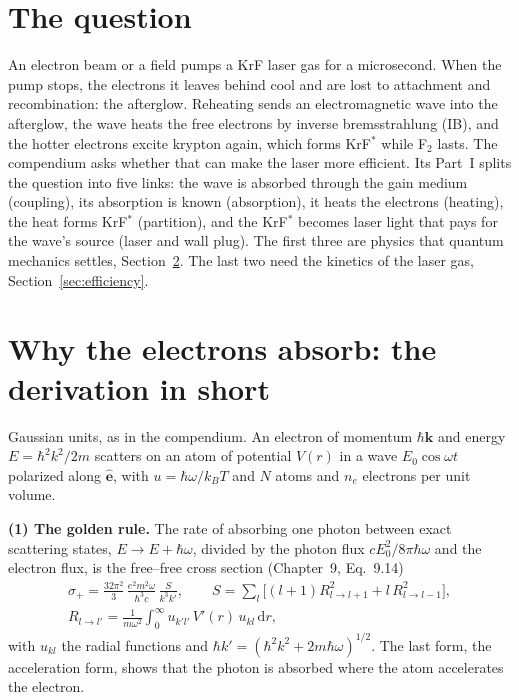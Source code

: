 \documentclass[11pt]{article}
\newcommand{\Ft}{F\ensuremath{_2}}
\newcommand{\KrF}{KrF\ensuremath{^*}}
\newcommand{\dd}{\mathrm d}
\newcommand{\kB}{k_B}
\begin{document}
\section{The question}
An electron beam or a field pumps a KrF laser gas for a microsecond. When the pump stops, the
electrons it leaves behind cool and are lost to attachment and recombination: the afterglow.
Reheating sends an electromagnetic wave into the afterglow, the wave heats the free electrons
by inverse bremsstrahlung (IB), and the hotter electrons excite krypton again, which forms
\KrF{} while \Ft{} lasts. The compendium asks whether that can make the laser more efficient.
Its Part~I splits the question into five links: the wave is absorbed through the gain medium
(coupling), its absorption is known (absorption), it heats the electrons (heating), the heat
forms \KrF{} (partition), and the \KrF{} becomes laser light that pays for the wave's source
(laser and wall plug). The first three are physics that quantum mechanics settles,
Section~\ref{sec:derivation}. The last two need the kinetics of the laser gas,
Section~\ref{sec:efficiency}.

\section{Why the electrons absorb: the derivation in short}
\label{sec:derivation}
Gaussian units, as in the compendium. An electron of momentum $\hbar\mathbf k$ and energy
$E=\hbar^2k^2/2m$ scatters on an atom of potential $V(r)$ in a wave $E_0\cos\omega t$ polarized
along $\hat{\mathbf e}$, with $u=\hbar\omega/\kB T$ and $N$ atoms and $n_e$ electrons per unit
volume.

\textbf{(1) The golden rule.} The rate of absorbing one photon between exact scattering states,
$E\to E+\hbar\omega$, divided by the photon flux $cE_0^2/8\pi\hbar\omega$ and the electron flux, is
the free--free cross section (Chapter~9, Eq.~9.14)
\begin{equation}
\begin{gathered}
\sigma_+=\frac{32\pi^2}{3}\,\frac{e^2m^2\omega}{\hbar^3c}\,\frac{S}{k^3k'},\qquad
S=\sum_{l}\big[(l+1)R_{l\to l+1}^2+l\,R_{l\to l-1}^2\big],\\
R_{l\to l'}=\frac{1}{m\omega^2}\int_0^\infty u_{k'l'}\,V'(r)\,u_{kl}\,\dd r,
\end{gathered}
\label{eq:golden}
\end{equation}
with $u_{kl}$ the radial functions and $\hbar k'=(\hbar^2k^2+2m\hbar\omega)^{1/2}$. The last form,
the acceleration form, shows that the photon is absorbed where the atom accelerates the electron.
\end{document}
